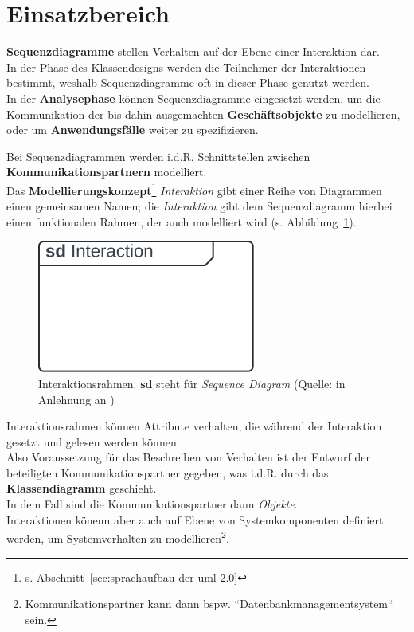 \section{Einsatzbereich}

\begin{tcolorbox}
    \textbf{Sequenzdiagramme} stellen Verhalten auf der Ebene einer Interaktion dar.\\
    In der Phase des Klassendesigns werden die Teilnehmer der Interaktionen bestimmt, weshalb Sequenzdiagramme oft in dieser Phase genutzt werden.\\
    In der \textbf{Analysephase} können Sequenzdiagramme eingesetzt werden, um die Kommunikation der bis dahin ausgemachten \textbf{Geschäftsobjekte} zu modellieren, oder um \textbf{Anwendungsfälle} weiter zu spezifizieren.
\end{tcolorbox}

\noindent
Bei Sequenzdiagrammen werden i.d.R. Schnittstellen zwischen \textbf{Kommunikationspartnern} modelliert.\\

\noindent
Das \textbf{Modellierungskonzept}\footnote{
s. Abschnitt~\ref{sec:sprachaufbau-der-uml-2.0}
} \textit{Interaktion} gibt einer Reihe von Diagrammen einen gemeinsamen Namen; die \textit{Interaktion} gibt dem Sequenzdiagramm hierbei einen funktionalen Rahmen, der auch modelliert wird (s. Abbildung~\ref{fig:interaktionsrahmen}).\\

\begin{figure}
    \centering
    \includegraphics[scale=0.5]{part three/Sequenzdiagramme/img/interaktionsrahmen}
    \caption{Interaktionsrahmen. \textbf{sd} steht für \textit{Sequence Diagram} (Quelle: in Anlehnung an \cite[596]{OMG17})}
    \label{fig:interaktionsrahmen}
\end{figure}

\noindent
Interaktionsrahmen können Attribute verhalten, die während der Interaktion gesetzt und gelesen werden können.\\

\noindent
Also Voraussetzung für das Beschreiben von Verhalten ist der Entwurf der beteiligten Kommunikationspartner gegeben, was i.d.R. durch das \textbf{Klassendiagramm} geschieht.\\
In dem Fall sind die Kommunikationspartner dann \textit{Objekte}.\\

\noindent
Interaktionen könenn aber auch auf Ebene von Systemkomponenten definiert werden, um Systemverhalten zu modellieren\footnote{
Kommunikationspartner kann dann bspw. ``Datenbankmanagementsystem`` sein.
}.
